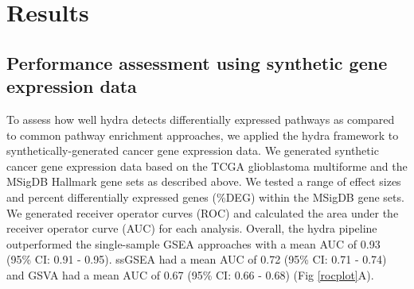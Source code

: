 \documentclass[10pt,letterpaper]{article}
\begin{document}
\section*{Results}
\subsection*{Performance assessment using synthetic gene expression data}
To assess how well hydra detects differentially expressed pathways as compared to common pathway enrichment approaches, we applied the hydra framework to synthetically-generated cancer gene expression data. We generated synthetic cancer gene expression data based on the TCGA glioblastoma multiforme and the MSigDB Hallmark gene sets as described above. We tested a range of effect sizes and percent differentially expressed genes (\%DEG) within the MSigDB gene sets. We generated receiver operator curves (ROC) and calculated the area under the receiver operator curve (AUC) for each analysis. Overall, the hydra pipeline outperformed the single-sample GSEA approaches with a mean AUC of 0.93 (95\% CI: 0.91 - 0.95). ssGSEA had a mean AUC of 0.72 (95\% CI: 0.71 - 0.74) and GSVA had a mean AUC of 0.67 (95\% CI: 0.66 - 0.68) (Fig \ref{rocplot}A).
\end{document}
